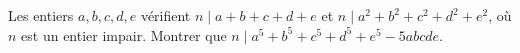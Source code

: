 Les entiers $a, b, c, d, e$ vérifient $n \mid a + b + c + d + e$ et $n \mid a^2 + b^2 + c^2 + d^2 + e^2$, où $n$ est un entier impair. Montrer que $n \mid a^5 + b^5 + c^5 + d^5 + e^5 - 5abcde$.
